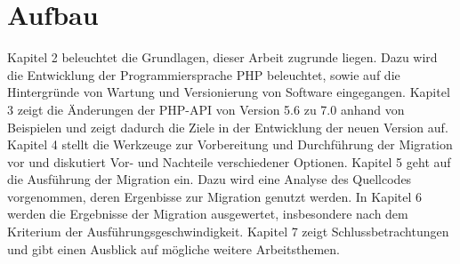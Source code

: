 \section{Aufbau}
Kapitel 2 beleuchtet die Grundlagen, dieser Arbeit zugrunde liegen. Dazu wird die Entwicklung der Programmiersprache PHP 
beleuchtet, sowie auf die Hintergründe von Wartung und Versionierung von Software eingegangen.
Kapitel 3 zeigt die Änderungen der PHP-API von Version 5.6 zu 7.0 anhand von Beispielen und zeigt dadurch die Ziele in der 
Entwicklung der neuen Version auf.
Kapitel 4 stellt die Werkzeuge zur Vorbereitung und Durchführung der Migration vor und diskutiert Vor- und Nachteile verschiedener 
Optionen.
Kapitel 5 geht auf die Ausführung der Migration ein. Dazu wird eine Analyse des Quellcodes vorgenommen, deren Ergenbisse 
zur Migration genutzt werden. 
In Kapitel 6 werden die Ergebnisse der Migration ausgewertet, insbesondere nach dem Kriterium der Ausführungsgeschwindigkeit.
Kapitel 7 zeigt Schlussbetrachtungen und gibt einen Ausblick auf mögliche weitere Arbeitsthemen.
